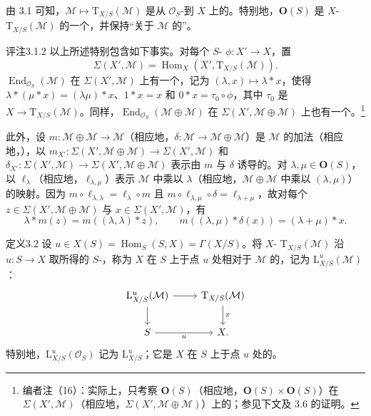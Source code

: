 由 3.1 可知，$\mathcal M\mapsto\mathrm T_{X/S}(\mathcal M)$ 是从 $\mathcal O_S$-到 $X$ 上的。特别地，$\mathbf O(S)$ 是 $X$- $\mathrm T_{X/S}(\mathcal M)$ 的一个，并保持“关于 $\mathcal M$ 的”。
\begin{SGAresult}{评注}{3.1.2}
以上所述特别包含如下事实。对每个 $S$- $\phi:X'\to X$，置
\[
\Sigma(X',\mathcal M)=\operatorname{Hom}_X(X',\mathrm T_{X/S}(\mathcal M)).
\]
 $\operatorname{End}_{\mathcal O_S}(\mathcal M)$ 在 $\Sigma(X',\mathcal M)$ 上有一个，记为 $(\lambda,x)\mapsto\lambda*x$，使得 $\lambda*(\mu*x)=(\lambda\mu)*x$、$1*x=x$ 和 $0*x=\tau_0\circ\phi$，其中 $\tau_0$ 是 $X\to\mathrm T_{X/S}(\mathcal M)$。同样，$\operatorname{End}_{\mathcal O_S}(\mathcal M\oplus\mathcal M)$ 在 $\Sigma(X',\mathcal M\oplus\mathcal M)$ 上也有一个。\footnote{编者注（16）：实际上，只考察 $\mathbf O(S)$（相应地，$\mathbf O(S)\times\mathbf O(S)$）在 $\Sigma(X',\mathcal M)$（相应地，$\Sigma(X',\mathcal M\oplus\mathcal M)$）上的；参见下文及 3.6 的证明。}

此外，设 $m:\mathcal M\oplus\mathcal M\to\mathcal M$（相应地，$\delta:\mathcal M\to\mathcal M\oplus\mathcal M$）是 $\mathcal M$ 的加法（相应地，），以 $m_{X'}:\Sigma(X',\mathcal M\oplus\mathcal M)\to\Sigma(X',\mathcal M)$ 和 $\delta_{X'}:\Sigma(X',\mathcal M)\to\Sigma(X',\mathcal M\oplus\mathcal M)$ 表示由 $m$ 与 $\delta$ 诱导的。对 $\lambda,\mu\in\mathbf O(S)$，以 $\ell_\lambda$（相应地，$\ell_{\lambda,\mu}$）表示 $\mathcal M$ 中乘以 $\lambda$（相应地，$\mathcal M\oplus\mathcal M$ 中乘以 $(\lambda,\mu)$）的映射。因为 $m\circ\ell_{\lambda,\lambda}=\ell_\lambda\circ m$ 且 $m\circ\ell_{\lambda,\mu}\circ\delta=\ell_{\lambda+\mu}$，故对每个 $z\in\Sigma(X',\mathcal M\oplus\mathcal M)$ 与 $x\in\Sigma(X',\mathcal M)$，有
\[
\lambda*m(z)=m((\lambda,\lambda)*z),\qquad
m((\lambda,\mu)*\delta(x))=(\lambda+\mu)*x.\tag{$\dagger$}
\]
\end{SGAresult}
\begin{SGAresult}{定义}{3.2}
设 $u\in X(S)=\operatorname{Hom}_S(S,X)=\Gamma(X/S)$。将 $X$- $\mathrm T_{X/S}(\mathcal M)$ 沿 $u:S\to X$ 取所得的 $S$-，称为 $X$ 在 $S$ 上于点 $u$ 处相对于 $\mathcal M$ 的，记为 $\mathrm L^u_{X/S}(\mathcal M)$：
\[
\begin{tikzcd}
\mathrm L^u_{X/S}(\mathcal M)\arrow[r]\arrow[d]&\mathrm T_{X/S}(\mathcal M)\arrow[d,"\pi"]\\
S\arrow[r,"u"']&X.
\end{tikzcd}
\]
特别地，$\mathrm L^u_{X/S}(\mathcal O_S)$ 记为 $\mathrm L^u_{X/S}$；它是 $X$ 在 $S$ 上于点 $u$ 处的。
\end{SGAresult}

